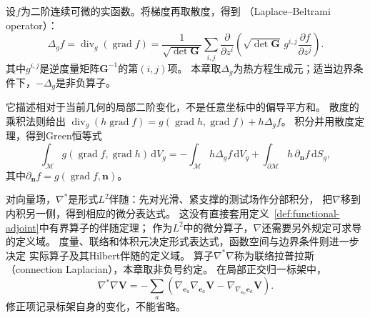 \begin{definition}
\label{def:geometry-laplace-beltrami}
设$f$为二阶连续可微的实函数。将梯度再取散度，得到
（Laplace--Beltrami operator）：
\begin{equation}
 \Delta_g f=\operatorname{div}_g(\operatorname{grad}f)
 =\frac1{\sqrt{\det\bm G}}\sum_{i,j}
  \frac{\partial}{\partial z^i}
   \left(\sqrt{\det\bm G}\,g^{i,j}
                   \frac{\partial f}{\partial z^j}\right).
 \label{eq:geometry-laplace-beltrami}
\end{equation}
其中$g^{i,j}$是逆度量矩阵$\bm G^{-1}$的第$(i,j)$项。
本章取$\Delta_g$为热方程生成元；适当边界条件下，$-\Delta_g$是非负算子。
\end{definition}
它描述相对于当前几何的局部二阶变化，不是任意坐标中的偏导平方和。
散度的乘积法则给出
$\operatorname{div}_g(h\operatorname{grad}f)
=g(\operatorname{grad}h,\operatorname{grad}f)+h\Delta_gf$。
积分并用散度定理，得到Green恒等式
\begin{equation}
 \int_{\mathcal M}g(\operatorname{grad}f,\operatorname{grad}h)\,\mathrm dV_g
 =-\int_{\mathcal M}h\Delta_gf\,\mathrm dV_g
   +\int_{\partial\mathcal M}h\,\partial_{\bm n}f\,\mathrm dS_g,
 \label{eq:geometry-green-identity}
\end{equation}
其中$\partial_{\bm n}f=g(\operatorname{grad}f,\bm n)$。

对向量场，$\nabla^*$是形式$L^2$伴随：先对光滑、紧支撑的测试场作分部积分，
把$\nabla$移到内积另一侧，得到相应的微分表达式。
这没有直接套用定义~\ref{def:functional-adjoint}中有界算子的伴随定理；
作为$L^2$中的微分算子，$\nabla$还需要另外规定可求导的定义域。
度量、联络和体积元决定形式表达式，函数空间与边界条件则进一步决定
实际算子及其Hilbert伴随的定义域。
算子$\nabla^*\nabla$称为联络拉普拉斯（connection Laplacian），本章取非负号约定。
在局部正交归一标架中，
\[
 \nabla^*\nabla\bm V
 =-\sum_a\left(\nabla_{\bm e_a}\nabla_{\bm e_a}\bm V
                 -\nabla_{\nabla_{\bm e_a}\bm e_a}\bm V\right).
\]
修正项记录标架自身的变化，不能省略。

